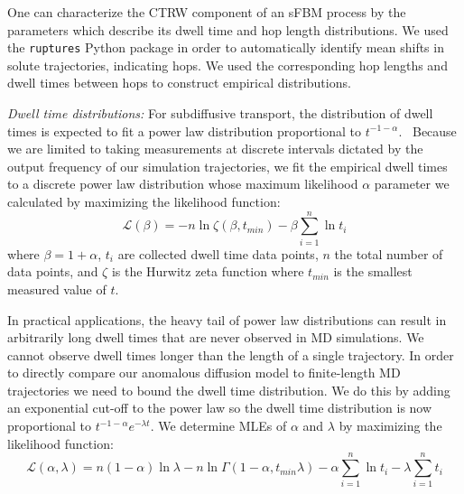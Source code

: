 \documentclass[12pt]{article}
\begin{document}
  
  One can characterize the CTRW component of an sFBM process by the parameters which describe
  its dwell time and hop length distributions. We used the \texttt{ruptures} Python
  package in order to automatically identify mean shifts in solute trajectories, 
  indicating hops.\cite{truong_ruptures:_2018} We used the corresponding hop lengths
  and dwell times between hops to construct empirical distributions.
  
  \textit{Dwell time distributions:} For subdiffusive transport, the distribution 
  of dwell times is expected to fit a power law distribution 
  proportional to $t^{-1-\alpha}$.~\cite{meroz_toolbox_2015}
  Because we are limited to taking measurements at discrete intervals dictated by the output 
  frequency of our simulation trajectories, we fit the empirical dwell times
  to a discrete power law distribution whose maximum likelihood $\alpha$ 
  parameter we calculated by maximizing the likelihood function: 
  \begin{equation}
	\mathcal{L}(\beta) = -n\ln \zeta(\beta, t_{min}) -
	\beta\sum_{i=1}^{n} \ln t_i 
  \label{eqn:powerlaw_likelihood}
  \end{equation}
  where $\beta = 1 + \alpha$, $t_i$ are collected dwell time data points,
  $n$ the total number of data points, and $\zeta$ is the Hurwitz zeta function
  where $t_{min}$ is the smallest measured value of	$t$.~\cite{clauset_power-law_2009}
  
  In practical applications, the heavy tail of power law distributions can result in 
  arbitrarily long dwell times that are never observed in MD simulations. We cannot
  observe dwell times longer than the length of a single trajectory. 
  In order to directly compare our anomalous diffusion model to finite-length MD 
  trajectories we need to bound the dwell time distribution. We do this by adding 
  an exponential cut-off to the power law so the dwell time distribution is 
  now proportional to $t^{-1 - \alpha}e^{-\lambda t}$.
  We determine MLEs of $\alpha$ and $\lambda$ by maximizing the likelihood function:~\cite{clauset_power-law_2009}
  \begin{equation}
    \mathcal{L}(\alpha, \lambda) = n(1 - \alpha)\ln\lambda - n\ln\Gamma(1 - \alpha, t_{min}\lambda) - \alpha\sum_{i=1}^{n}\ln t_i - \lambda\sum_{i=1}^n t_i
  \label{eqn:powerlaw_cutoff_likelihood}
  \end{equation}
  
\end{document}
